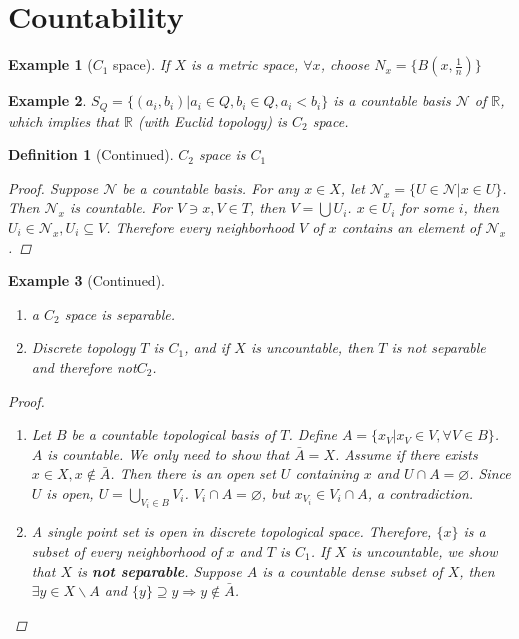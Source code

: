 \documentclass{article}
\def\emptyset{\varnothing}
\newtheorem{example}{Example}[section] %
\newtheorem{definition}{Definition}[section]
\begin{document}
\section{Countability}
\setcounter{example}{-1}
\begin{example}[$C_1$ space]
If $X$ is a metric space, $\forall x$, choose $N_x=\{B(x,\frac{1}{n})\}$
\end{example}
\begin{example}
$S_{Q}=\{(a_i,b_i)|a_i\in Q,b_i \in Q,a_i<b_i\}$ is a countable basis $\mathcal{N}$ of $\mathbb{R}$, which implies that $\mathbb{R}$ (with Euclid topology) is $C_2$ space.
\end{example}
\begin{definition}[Continued]
$C_2$ space is $C_1$
\begin{proof}
Suppose $\mathcal{N}$ be a countable basis. For any $x\in X$, let $\mathcal{N}_x=\{U\in \mathcal{N}|x\in U\}$. Then $\mathcal{N}_x$ is countable. For $V\ni x,V\in T$,
then $V=\bigcup U_i$. $x\in U_i$ for some $i$, then $U_i \in \mathcal{N}_x,U_i\subseteq V$. Therefore every neighborhood $V$ of $x$ contains an element of $\mathcal{N}_x$. 
\end{proof}
\end{definition}
\begin{example}[Continued]\mbox{}
\begin{enumerate}[label=(\alph*)]
\item a $C_2$ space is separable.
\item Discrete topology $T$ is $C_1$, and if $X$ is uncountable, then $T$ is not separable and therefore not$C_2$.
\end{enumerate}
\begin{proof}\mbox{}
\begin{enumerate}[label=(\alph*)]
\item Let $B$ be a countable topological basis of $T$. Define $A=\{x_V| x_V \in V,\forall V\in B\}$. $A$ is countable. We only need to show that $\bar{A}=X$. Assume if there exists $x\in X, x\not\in \bar{A}$. Then there is an open set $U$ containing $x$ and $ U \cap A=\emptyset$. Since $U$ is open, $U=\displaystyle\bigcup_{V_i\in B} V_i$. $V_i\cap A=\emptyset$, but $x_{V_i}\in V_i \cap A$, a contradiction.
\item A single point set is open in discrete topological space. Therefore, $\{x\}$ is a subset of every neighborhood of $x$ and $T$ is $C_1$.
If $X$ is uncountable, we show that $X$ is \textbf{not separable}. Suppose $A$ is a countable dense subset of $X$, then $\exists y\in X\backslash A$ and $\{y\}\supseteq y\Rightarrow y \not\in \bar{A}$.
\end{enumerate}
\end{proof}
\end{example}
\end{document}
